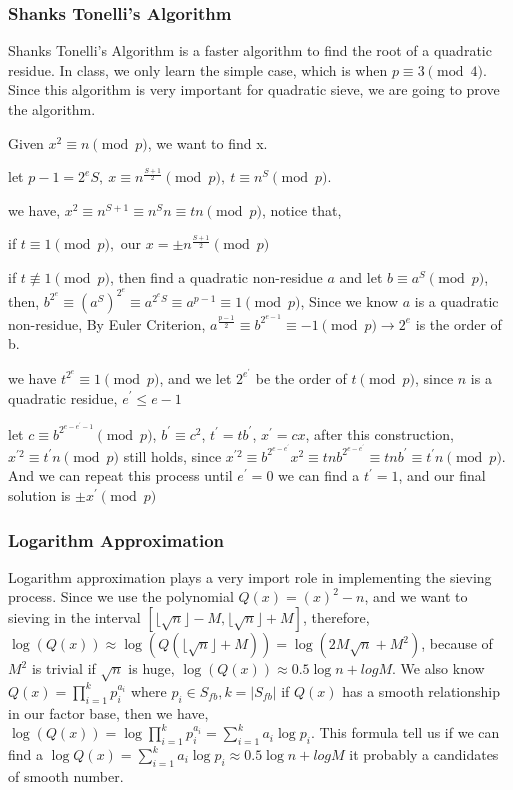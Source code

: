 \documentclass[12pt]{article} %
\begin{document}
\subsubsection{Shanks Tonelli's Algorithm}

Shanks Tonelli's Algorithm is a faster algorithm to find the root of a quadratic residue. In class, we only learn the simple case, which is when $p \equiv 3 \pmod{4}$. Since this algorithm is very important for quadratic sieve, we are going to prove the algorithm.

Given $x^2 \equiv n \pmod{p} $, we want to find x.

let $p-1 = 2^eS,\ x \equiv n^{\frac{S+1}{2}} \pmod{p},\ t \equiv n^S \pmod{p}.$

we have, $x^2 \equiv n^{S+1} \equiv n^Sn \equiv tn \pmod{p}$, notice that, 

if $t \equiv 1 \pmod{p},$ our $x = \pm n^{\frac{S+1}{2}} \pmod{p}$

if $t \not\equiv 1 \pmod{p}$, then find a quadratic non-residue $a$ and let $b \equiv a^S \pmod{p}$, then, $b^{2^e} \equiv (a^S)^{2^e} \equiv a^{2^eS} \equiv a^{p-1} \equiv 1 \pmod{p}$, Since we know $a$ is a quadratic non-residue, By Euler Criterion, $a^{\frac{p-1}{2}} \equiv b^{2^{e-1}} \equiv -1 \pmod{p} \rightarrow 2^e$ is the order of b.

we have $t^{2^e} \equiv 1 \pmod{p}$, and we let $2^{e^\prime}$ be the order of $t \pmod{p}$, since $n$ is a quadratic residue, $e^\prime \le e-1$

let $c \equiv b^{2^{e-e^\prime-1}} \pmod{p}$, $b^\prime \equiv c^2$, $t^\prime = tb^\prime$, $x^\prime = cx$, after this construction, $x^{\prime 2} \equiv t^\prime n \pmod{p}$ still holds, since $x^{\prime 2} \equiv b^{2^{e-e^\prime}}x^2 \equiv tnb^{2^{e-e^\prime}} \equiv tnb^\prime \equiv  t^\prime n \pmod{p}$. And we can repeat this process until $e^\prime = 0$ we can find a $t^\prime = 1$, and our final solution is $ \pm x^\prime \pmod{p}$

\subsubsection{Logarithm Approximation}

Logarithm approximation plays a very import role in implementing the sieving process.
Since we use the polynomial $Q(x) = (x)^2-n$, and we want to sieving in the interval  $[\lfloor \sqrt{n} \rfloor - M, \lfloor \sqrt{n} \rfloor + M]$, therefore, $\log{(Q(x))} \approx \log{(Q(\lfloor \sqrt{n} \rfloor + M))} = \log{(2M\sqrt{n}+M^2)}$, because of $M^2$ is trivial if $\sqrt{n}$ is huge, $\log{(Q(x))} \approx 0.5\log{n} + log{M}$. We also know $Q(x) = \prod_{i=1}^k{p_i^{a_i}}$ where $p_i \in S_{fb}, k=|S_{fb}|$ if $Q(x)$ has a smooth relationship in our factor base, then we have,  $\log{(Q(x))} = \log{\prod_{i=1}^k{p_i^{a_i}}} = \sum_{i=1}^k{a_i\log{p_i}}$. This formula tell us if we can find a $\log{Q(x)} = \sum_{i=1}^k{a_i\log{p_i}} \approx 0.5\log{n} + log{M}$ it probably a candidates of smooth number.
\end{document}
